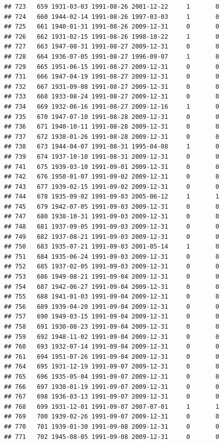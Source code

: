 \documentclass[
]{book}
\begin{document}
\begin{verbatim}
## 723   659 1931-03-03 1991-08-26 2001-12-22     1       0
## 724   660 1944-02-14 1991-08-26 1997-03-03     1       0
## 725   661 1940-01-31 1991-08-26 2009-12-31     0       0
## 726   662 1931-02-15 1991-08-26 1998-10-22     1       0
## 727   663 1947-08-31 1991-08-27 2009-12-31     0       0
## 728   664 1936-07-05 1991-08-27 1996-09-07     1       0
## 729   665 1951-06-15 1991-08-27 2009-12-31     0       0
## 731   666 1947-04-19 1991-08-27 2009-12-31     0       0
## 732   667 1931-09-08 1991-08-27 2009-12-31     0       0
## 733   668 1933-08-24 1991-08-27 2009-12-31     0       0
## 734   669 1932-06-16 1991-08-27 2009-12-16     1       0
## 735   670 1947-07-10 1991-08-28 2009-12-31     0       0
## 736   671 1940-10-11 1991-08-28 2009-12-31     0       0
## 737   672 1938-01-26 1991-08-28 2009-12-31     0       0
## 738   673 1944-04-07 1991-08-31 1995-04-08     1       0
## 739   674 1937-10-10 1991-08-31 2009-12-31     0       0
## 741   675 1939-03-10 1991-09-01 2009-12-31     0       0
## 742   676 1950-01-07 1991-09-02 2009-12-31     0       0
## 743   677 1939-02-15 1991-09-02 2009-12-31     0       0
## 744   678 1935-09-02 1991-09-03 2005-06-12     1       1
## 745   679 1942-07-05 1991-09-03 2009-12-31     0       0
## 747   680 1938-10-31 1991-09-03 2009-12-31     0       0
## 748   681 1937-09-05 1991-09-03 2009-12-31     0       0
## 749   682 1937-08-21 1991-09-03 2009-12-31     0       0
## 750   683 1935-07-21 1991-09-03 2001-05-14     1       0
## 751   684 1935-06-24 1991-09-03 2009-12-31     0       0
## 752   685 1937-02-05 1991-09-03 2009-12-31     0       0
## 753   686 1949-08-21 1991-09-04 2009-12-31     0       0
## 754   687 1942-06-27 1991-09-04 2009-12-31     0       0
## 755   688 1941-01-03 1991-09-04 2009-12-31     0       0
## 756   689 1939-04-20 1991-09-04 2009-12-31     0       0
## 757   690 1949-03-15 1991-09-04 2009-12-31     0       0
## 758   691 1930-08-23 1991-09-04 2009-12-31     0       0
## 759   692 1948-11-02 1991-09-04 2009-12-31     0       0
## 760   693 1932-07-14 1991-09-04 2009-12-31     0       0
## 761   694 1951-07-26 1991-09-04 2009-12-31     0       0
## 764   695 1931-12-19 1991-09-07 2009-12-31     0       0
## 765   696 1935-05-04 1991-09-07 2009-12-31     0       0
## 766   697 1938-01-19 1991-09-07 2009-12-31     0       0
## 767   698 1936-03-13 1991-09-07 2009-12-31     0       0
## 768   699 1931-12-01 1991-09-07 2007-07-01     1       1
## 769   700 1939-02-26 1991-09-07 2009-12-31     0       0
## 770   701 1939-01-30 1991-09-08 2009-12-31     0       0
## 771   702 1945-08-05 1991-09-08 2009-12-31     0       0

\end{verbatim}
\end{document}
